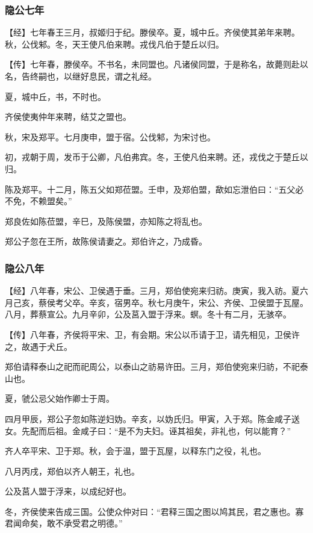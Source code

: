 \documentclass[]{article}
\begin{document}
\hypertarget{header-n91}{%
\subsubsection{隐公七年}\label{header-n91}}

【经】七年春王三月，叔姬归于纪。滕侯卒。夏，城中丘。齐侯使其弟年来聘。秋，公伐邾。冬，天王使凡伯来聘。戎伐凡伯于楚丘以归。

【传】七年春，滕侯卒。不书名，未同盟也。凡诸侯同盟，于是称名，故薨则赴以名，告终嗣也，以继好息民，谓之礼经。

夏，城中丘，书，不时也。

齐侯使夷仲年来聘，结艾之盟也。

秋，宋及郑平。七月庚申，盟于宿。公伐邾，为宋讨也。

初，戎朝于周，发币于公卿，凡伯弗宾。冬，王使凡伯来聘。还，戎伐之于楚丘以归。

陈及郑平。十二月，陈五父如郑莅盟。壬申，及郑伯盟，歃如忘泄伯曰：``五父必不免，不赖盟矣。''

郑良佐如陈莅盟，辛巳，及陈侯盟，亦知陈之将乱也。

郑公子忽在王所，故陈侯请妻之。郑伯许之，乃成昏。

\hypertarget{header-n103}{%
\subsubsection{隐公八年}\label{header-n103}}

【经】八年春，宋公、卫侯遇于垂。三月，郑伯使宛来归祊。庚寅，我入祊。夏六月己亥，蔡侯考父卒。辛亥，宿男卒。秋七月庚午，宋公、齐侯、卫侯盟于瓦屋。八月，葬蔡宣公。九月辛卯，公及莒入盟于浮来。螟。冬十有二月，无骇卒。

【传】八年春，齐侯将平宋、卫，有会期。宋公以币请于卫，请先相见，卫侯许之，故遇于犬丘。

郑伯请释泰山之祀而祀周公，以泰山之祊易许田。三月，郑伯使宛来归祊，不祀泰山也。

夏，虢公忌父始作卿士于周。

四月甲辰，郑公子忽如陈逆妇妫。辛亥，以妫氏归。甲寅，入于郑。陈金咸子送女。先配而后祖。金咸子曰：``是不为夫妇。诬其祖矣，非礼也，何以能育？''

齐人卒平宋、卫于郑。秋，会于温，盟于瓦屋，以释东门之役，礼也。

八月丙戌，郑伯以齐人朝王，礼也。

公及莒人盟于浮来，以成纪好也。

冬，齐侯使来告成三国。公使众仲对曰：``君释三国之图以鸠其民，君之惠也。寡君闻命矣，敢不承受君之明德。''
\end{document}
